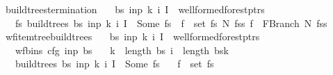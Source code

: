 \begin{isabellebody}
\isadelimproof
%
\endisadelimproof
%
\isatagproof
%
\endisatagproof
{\isafoldproof}%
%
\isadelimproof
\isanewline
%
\endisadelimproof
{}\isamarkupfalse%
\ build{\isacharunderscore}{\kern0pt}trees{\isacharprime}{\kern0pt}{\isacharunderscore}{\kern0pt}termination{\isacharcolon}{\kern0pt}\isanewline
\ \ \ {\isachardoublequoteopen}{\isacharparenleft}{\kern0pt}bs{\isacharcomma}{\kern0pt}\ inp{\isacharcomma}{\kern0pt}\ k{\isacharcomma}{\kern0pt}\ i{\isacharcomma}{\kern0pt}\ I{\isacharparenright}{\kern0pt}\ {\isasymin}\ wellformed{\isacharunderscore}{\kern0pt}forest{\isacharunderscore}{\kern0pt}ptrs{\isachardoublequoteclose}\isanewline
\ \ \ {\isachardoublequoteopen}{\isasymexists}fs{\isachardot}{\kern0pt}\ build{\isacharunderscore}{\kern0pt}trees{\isacharprime}{\kern0pt}\ bs\ inp\ k\ i\ I\ {\isacharequal}{\kern0pt}\ Some\ fs\ {\isasymand}\ {\isacharparenleft}{\kern0pt}{\isasymforall}f\ {\isasymin}\ set\ fs{\isachardot}{\kern0pt}\ {\isasymexists}N\ fss{\isachardot}{\kern0pt}\ f\ {\isacharequal}{\kern0pt}\ FBranch\ N\ fss{\isacharparenright}{\kern0pt}{\isachardoublequoteclose}%
\isadelimproof
%
\endisadelimproof
%
\isatagproof
%
\endisatagproof
{\isafoldproof}%
%
\isadelimproof
\isanewline
%
\endisadelimproof
{}\isamarkupfalse%
\ wf{\isacharunderscore}{\kern0pt}item{\isacharunderscore}{\kern0pt}tree{\isacharunderscore}{\kern0pt}build{\isacharunderscore}{\kern0pt}trees{\isacharprime}{\kern0pt}{\isacharcolon}{\kern0pt}\isanewline
\ \ \ {\isachardoublequoteopen}{\isacharparenleft}{\kern0pt}bs{\isacharcomma}{\kern0pt}\ inp{\isacharcomma}{\kern0pt}\ k{\isacharcomma}{\kern0pt}\ i{\isacharcomma}{\kern0pt}\ I{\isacharparenright}{\kern0pt}\ {\isasymin}\ wellformed{\isacharunderscore}{\kern0pt}forest{\isacharunderscore}{\kern0pt}ptrs{\isachardoublequoteclose}\isanewline
\ \ \ {\isachardoublequoteopen}wf{\isacharunderscore}{\kern0pt}bins\ cfg\ inp\ bs{\isachardoublequoteclose}\isanewline
\ \ \ {\isachardoublequoteopen}k\ {\isacharless}{\kern0pt}\ length\ bs{\isachardoublequoteclose}\ {\isachardoublequoteopen}i\ {\isacharless}{\kern0pt}\ length\ {\isacharparenleft}{\kern0pt}bs{\isacharbang}{\kern0pt}k{\isacharparenright}{\kern0pt}{\isachardoublequoteclose}\isanewline
\ \ \ {\isachardoublequoteopen}build{\isacharunderscore}{\kern0pt}trees{\isacharprime}{\kern0pt}\ bs\ inp\ k\ i\ I\ {\isacharequal}{\kern0pt}\ Some\ fs{\isachardoublequoteclose}\isanewline
\ \ \ {\isachardoublequoteopen}f\ {\isasymin}\ set\ fs{\isachardoublequoteclose}\isanewline

\end{isabellebody}
